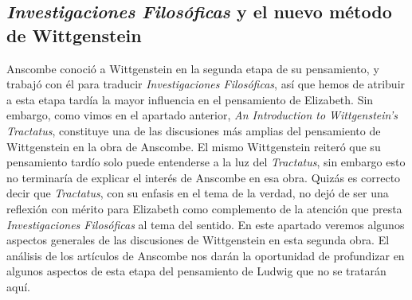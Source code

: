 \subsection{\emph{Investigaciones Filosóficas} y el nuevo método de Wittgenstein}

Anscombe conoció a Wittgenstein en la segunda etapa de su pensamiento, y trabajó con él para traducir \emph{Investigaciones Filosóficas}, así que hemos de atribuir a esta etapa tardía la mayor influencia en el pensamiento de Elizabeth. Sin embargo, como vimos en el apartado anterior, \emph{An Introduction to Wittgenstein's Tractatus}, constituye una de las discusiones más amplias del pensamiento de Wittgenstein en la obra de Anscombe. El mismo Wittgenstein reiteró que su pensamiento tardío solo puede entenderse a la luz del \emph{Tractatus}, sin embargo esto no terminaría de explicar el interés de Anscombe en esa obra. Quizás es correcto decir que \emph{Tractatus}, con su enfasis en el tema de la verdad, no dejó de ser una reflexión con mérito para Elizabeth como complemento de la atención que presta \emph{Investigaciones Filosóficas} al tema del sentido\autocite[Cf.~][191--193]{teichmann2008ans}. En este apartado veremos algunos aspectos generales de las discusiones de Wittgenstein en esta segunda obra. El análisis de los artículos de Anscombe nos darán la oportunidad de profundizar en algunos aspectos de esta etapa del pensamiento de Ludwig que no se tratarán aquí.

